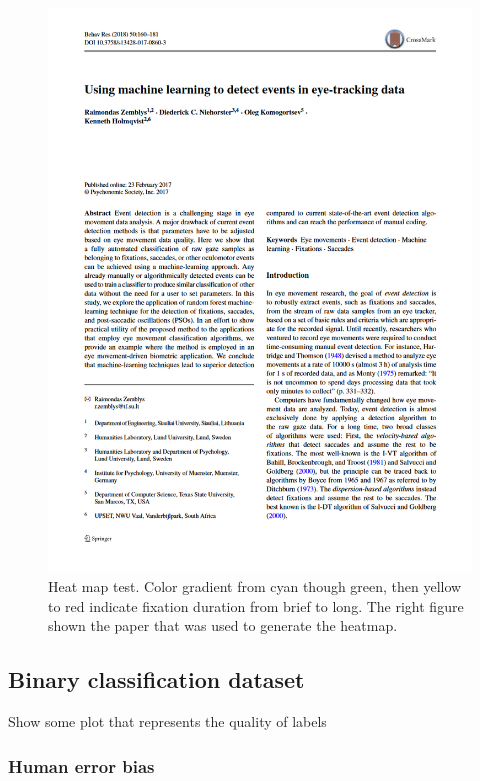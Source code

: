 \begin{figure}
\begin{minipage}{0.5\textwidth}
        \includegraphics[width=\textwidth]{Images/DataQuality/Paper.png}
    \end{minipage}
    \caption{Heat map test. Color gradient from cyan though green, then yellow to red indicate fixation duration from brief to long. The right figure shown the paper that was used to generate the heatmap.}
    \label{fig:res_PaperHeatmap}
\end{figure}

\subsection{Binary classification dataset}

Show some plot that represents the quality of labels

\subsubsection{Human error bias}

